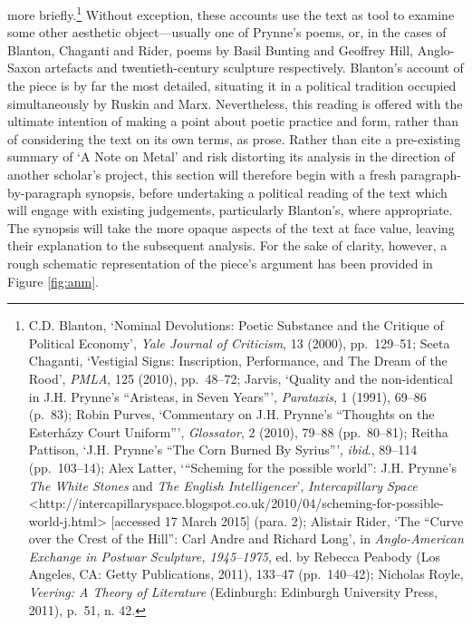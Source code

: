 \documentclass[]{article}
\begin{document}
more briefly.\footnote{C.D. Blanton, ‘Nominal Devolutions: Poetic
  Substance and the Critique of Political Economy’, \emph{Yale Journal
  of Criticism}, 13 (2000), pp.~129–51; Seeta Chaganti, ‘Vestigial
  Signs: Inscription, Performance, and The Dream of the Rood’,
  \emph{PMLA}, 125 (2010), pp.~48–72; Jarvis, ‘Quality and the
  non-identical in J.H. Prynne’s “Aristeas, in Seven Years”’,
  \emph{Parataxis}, 1 (1991), 69–86 (p.~83); Robin Purves, ‘Commentary
  on J.H. Prynne’s “Thoughts on the Esterházy Court Uniform”’,
  \emph{Glossator}, 2 (2010), 79–88 (pp.~80–81); Reitha Pattison, ‘J.H.
  Prynne’s “The Corn Burned By Syrius”’, \emph{ibid}., 89–114
  (pp.~103–14); Alex Latter, ‘“Scheming for the possible world”: J.H.
  Prynne’s \emph{The White Stones} and \emph{The English
  Intelligencer}’, \emph{Intercapillary Space}
  \textless{}http://intercapillaryspace.blogspot.co.uk/2010/04/scheming-for-possible-world-j.html\textgreater{}
  {[}accessed 17 March 2015{]} (para. 2); Alistair Rider, ‘The “Curve
  over the Crest of the Hill”: Carl Andre and Richard Long’, in
  \emph{Anglo-American Exchange in Postwar Sculpture, 1945–1975}, ed. by
  Rebecca Peabody (Los Angeles, CA: Getty Publications, 2011), 133–47
  (pp.~140–42); Nicholas Royle, \emph{Veering: A Theory of Literature}
  (Edinburgh: Edinburgh University Press, 2011), p.~51, n. 42.} Without
exception, these accounts use the text as tool to examine some other
aesthetic object—usually one of Prynne’s poems, or, in the cases of
Blanton, Chaganti and Rider, poems by Basil Bunting and Geoffrey Hill,
Anglo-Saxon artefacts and twentieth-century sculpture respectively.
Blanton’s account of the piece is by far the most detailed, situating it
in a political tradition occupied simultaneously by Ruskin and Marx.
Nevertheless, this reading is offered with the ultimate intention of
making a point about poetic practice and form, rather than of
considering the text on its own terms, as prose. Rather than cite a
pre-existing summary of ‘A Note on Metal’ and risk distorting its
analysis in the direction of another scholar’s project, this section
will therefore begin with a fresh paragraph-by-paragraph synopsis,
before undertaking a political reading of the text which will engage
with existing judgements, particularly Blanton’s, where appropriate. The
synopsis will take the more opaque aspects of the text at face value,
leaving their explanation to the subsequent analysis. For the sake of
clarity, however, a rough schematic representation of the piece’s
argument has been provided in Figure \ref{fig:anm}.
\end{document}
